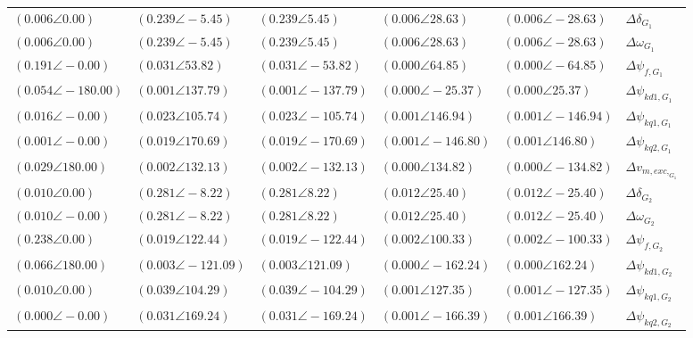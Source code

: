 \begin{tabular}{lllll|l}
$(0.006 \angle 0.00)$	& $\mathbf{(0.239 \angle -5.45)}$	& $\mathbf{(0.239 \angle 5.45)}$	& $(0.006 \angle 28.63)$	& $(0.006 \angle -28.63)$	& $\Delta\delta_{G_1}$ \\ 
$(0.006 \angle 0.00)$	& $\mathbf{(0.239 \angle -5.45)}$	& $\mathbf{(0.239 \angle 5.45)}$	& $(0.006 \angle 28.63)$	& $(0.006 \angle -28.63)$	& $\Delta\omega_{G_1}$ \\ 
$\mathbf{(0.191 \angle -0.00)}$	& $(0.031 \angle 53.82)$	& $(0.031 \angle -53.82)$	& $(0.000 \angle 64.85)$	& $(0.000 \angle -64.85)$	& $\Delta \psi_{f,G_1}$ \\ 
$\mathbf{(0.054 \angle -180.00)}$	& $(0.001 \angle 137.79)$	& $(0.001 \angle -137.79)$	& $(0.000 \angle -25.37)$	& $(0.000 \angle 25.37)$	& $\Delta \psi_{kd1,G_1}$ \\ 
$(0.016 \angle -0.00)$	& $(0.023 \angle 105.74)$	& $(0.023 \angle -105.74)$	& $(0.001 \angle 146.94)$	& $(0.001 \angle -146.94)$	& $\Delta \psi_{kq1,G_1}$ \\ 
$(0.001 \angle -0.00)$	& $(0.019 \angle 170.69)$	& $(0.019 \angle -170.69)$	& $(0.001 \angle -146.80)$	& $(0.001 \angle 146.80)$	& $\Delta \psi_{kq2,G_1}$ \\ 
$(0.029 \angle 180.00)$	& $(0.002 \angle 132.13)$	& $(0.002 \angle -132.13)$	& $(0.000 \angle 134.82)$	& $(0.000 \angle -134.82)$	& $\Delta v_{m,exc,_{G_1}}$ \\ 
 \hline 
$(0.010 \angle 0.00)$	& $\mathbf{(0.281 \angle -8.22)}$	& $\mathbf{(0.281 \angle 8.22)}$	& $(0.012 \angle 25.40)$	& $(0.012 \angle -25.40)$	& $\Delta\delta_{G_2}$ \\ 
$(0.010 \angle -0.00)$	& $\mathbf{(0.281 \angle -8.22)}$	& $\mathbf{(0.281 \angle 8.22)}$	& $(0.012 \angle 25.40)$	& $(0.012 \angle -25.40)$	& $\Delta\omega_{G_2}$ \\ 
$\mathbf{(0.238 \angle 0.00)}$	& $(0.019 \angle 122.44)$	& $(0.019 \angle -122.44)$	& $(0.002 \angle 100.33)$	& $(0.002 \angle -100.33)$	& $\Delta \psi_{f,G_2}$ \\ 
$\mathbf{(0.066 \angle 180.00)}$	& $(0.003 \angle -121.09)$	& $(0.003 \angle 121.09)$	& $(0.000 \angle -162.24)$	& $(0.000 \angle 162.24)$	& $\Delta \psi_{kd1,G_2}$ \\ 
$(0.010 \angle 0.00)$	& $(0.039 \angle 104.29)$	& $(0.039 \angle -104.29)$	& $(0.001 \angle 127.35)$	& $(0.001 \angle -127.35)$	& $\Delta \psi_{kq1,G_2}$ \\ 
$(0.000 \angle -0.00)$	& $(0.031 \angle 169.24)$	& $(0.031 \angle -169.24)$	& $(0.001 \angle -166.39)$	& $(0.001 \angle 166.39)$	& $\Delta \psi_{kq2,G_2}$ \\ 

\end{tabular}
